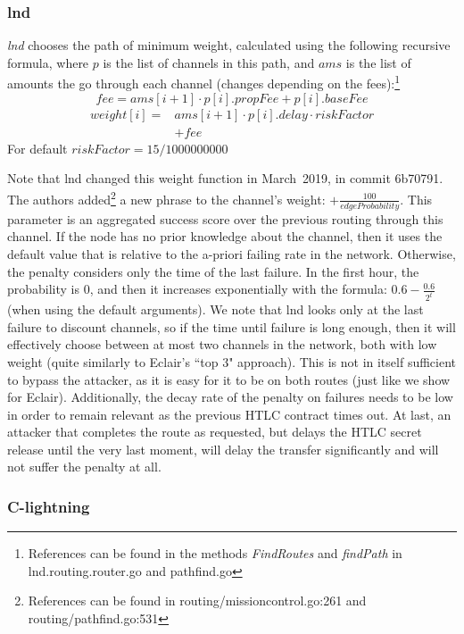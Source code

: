 \subsubsection{lnd}
\emph{lnd} chooses the path of minimum weight, 
calculated using the following recursive formula, 
where $p$ is the list of channels in this path, 
and $ams$ is the list of amounts the go
through each channel (changes depending on the fees):\footnote{References can be found in the methods \emph{FindRoutes} and \emph{findPath} in lnd.routing.router.go and pathfind.go}
$$ fee = ams[i+1] \cdot p[i].propFee + p[i].baseFee $$
\begin{align*}
    weight[i] = &ams[i+1] \cdot p[i].delay \cdot riskFactor \\
                &+ fee
\end{align*}
For default $riskFactor = 15 / \num{1000000000}$

Note that lnd changed this weight function in March~2019, in commit 6b70791. The authors added\footnote{References can be found in routing/missioncontrol.go:261 and routing/pathfind.go:531} a new phrase to the channel's weight: $+ \frac{100}{edgeProbability}$.
This parameter is an aggregated success score over the previous routing through this channel. If the node has no prior knowledge about the channel, then it uses the default value that is relative to the a-priori failing rate in the network. Otherwise, the penalty considers only the time of the last failure. In the first hour, the probability is $0$, and then it increases exponentially with the formula: $0.6 - \frac{0.6}{2^t}$ (when using the default arguments).
We note that lnd looks only at the last failure to discount channels, so if the time until failure is long enough, then it will effectively choose between at most two channels in the network, both with low weight (quite similarly to Eclair's ``top 3" approach). This is not in itself sufficient to bypass the attacker, as it is easy for it to be on both routes (just like we show for Eclair). Additionally, the decay rate of the penalty on failures needs to be low in order to remain relevant as the previous HTLC contract times out. At last, an attacker that completes the route as requested, but delays the HTLC secret release until the very last moment, will delay the transfer significantly and will not suffer the penalty at all.

\subsubsection{C-lightning}

